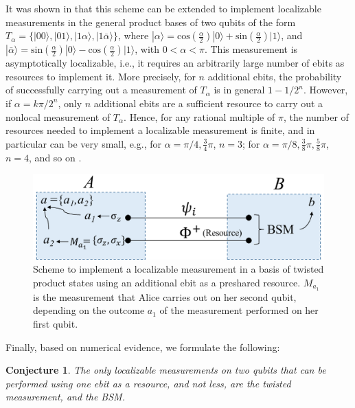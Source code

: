 \documentclass[a4paper,twocolumn,11pt,accepted=2024-02-14]{quantumarticle}
\newcommand{\ket}[1]{| {#1} \rangle} %
\newtheorem{conj}{Conjecture}
\begin{document}
It was shown in \cite{groisman2002measurements, groisman2003instantaneous} that this scheme can be extended to implement localizable measurements in the general product bases of two qubits of the form $T_\alpha=\{\ket{00}, \ket{01}, \ket{1   \alpha}, \ket{1\bar{\alpha}}\}$, where $\ket{\alpha}=\text{cos}(\frac{\alpha}{2})\ket 0 + \text{sin}(\frac{\alpha}{2})\ket 1$, and $\ket{\bar \alpha}=\text{sin}(\frac{\alpha}{2})\ket 0 - \text{cos}(\frac{\alpha}{2})\ket 1$, with $0<\alpha<\pi$. This measurement is asymptotically localizable, i.e., it requires an arbitrarily large number of ebits as resources to implement it. More precisely, for $n$ additional ebits, the probability of successfully carrying out a measurement of $T_\alpha$ is in general $1-1/2^n$. However, if $\alpha=k\pi/2^n$, only $n$ additional ebits are a sufficient resource to carry out a nonlocal measurement of $T_{\alpha}$. Hence, for any rational multiple of $\pi$, the number of resources needed to implement a localizable measurement is finite, and in particular can be very small, e.g., for $\alpha=\pi/4, \frac{3}{4}\pi$, $n=3$; for $\alpha=\pi/8, \frac{3}{8}\pi, \frac{5}{8}\pi$, $n=4$, and so on  \cite{groisman2002measurements}. 

 \begin{figure}[ht]
    \centering    \includegraphics[width=.48\textwidth]{twisted_local.png}
    \caption{Scheme to implement a localizable measurement in a basis of  twisted product  states using an additional ebit as a preshared resource. $M_{a_1}$ is the measurement that Alice carries out on her second qubit, depending on the outcome $a_1$ of the measurement performed on her first qubit.}
    \label{fig3}
\end{figure}


Finally, based on numerical evidence, we formulate the following:
\begin{conj}
    The only localizable measurements on two qubits that can be performed using one ebit as a resource, and not less, are the twisted measurement, and the BSM.
\end{conj}
\end{document}
